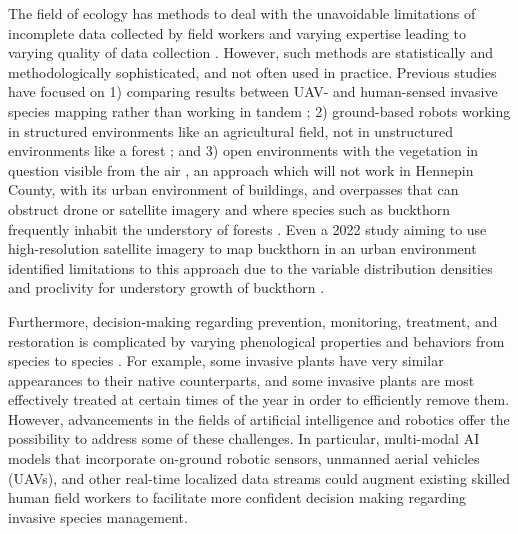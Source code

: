 \documentclass{article}
\begin{document}
The field of ecology has methods to deal with the unavoidable limitations of incomplete data collected by field workers \cite{https://doi.org/10.1890/0012-9658} and varying expertise leading to varying quality of data collection \cite{5694101}. However, such methods are statistically and methodologically sophisticated, and not often used in practice. Previous studies have focused on 1) comparing results between UAV- and human-sensed invasive species mapping rather than working in tandem \cite{new-tools-old-problems} \cite{PMID:40775501}; 2) ground-based robots working in structured environments like an agricultural field, not in unstructured environments like a forest \cite{7989612}; and 3) open environments with the vegetation in question visible from the air \cite{new-tools-old-problems} \cite{PMID:40775501}, an approach which will not work in Hennepin County, with its urban environment of buildings, and overpasses that can obstruct drone or satellite imagery and where species such as buckthorn frequently inhabit the understory of forests \cite{mda_common_buckthorn}. Even a 2022 study aiming to use high-resolution satellite imagery to map buckthorn in an urban environment identified limitations to this approach due to the variable distribution densities and proclivity for understory growth of buckthorn \cite{Nininahazwe02102023}.

Furthermore, decision-making regarding prevention, monitoring, treatment, and restoration is complicated by varying phenological properties and behaviors from species to species \cite{review-operations-research-models}. For example, some invasive plants have very similar appearances to their native counterparts, and some invasive plants are most effectively treated at certain times of the year in order to efficiently remove them. However, advancements in the fields of artificial intelligence and robotics offer the possibility to address some of these challenges. In particular, multi-modal AI models that incorporate on-ground robotic sensors, unmanned aerial vehicles (UAVs), and other real-time localized data streams could augment existing skilled human field workers to facilitate more confident decision making regarding invasive species management.
\end{document}
